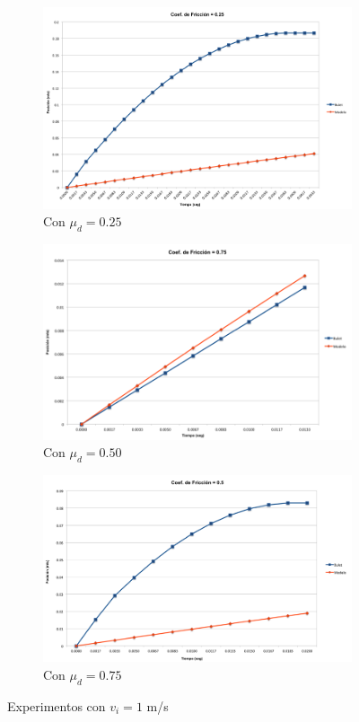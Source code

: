 \documentclass{article}
\begin{document}
\begin{itemize}
\begin{figure}[!ht] 
  \begin{subfigure}[b]{0.5\linewidth}
    \centering
    \includegraphics[width=0.75\linewidth]{image004.png} 
    \caption{Con $\mu_d=0.25$} 
    \label{fig3:a} 
    \vspace{4ex}
  \end{subfigure}%
  \begin{subfigure}[b]{0.5\linewidth}
    \centering
    \includegraphics[width=0.75\linewidth]{image005.png} 
    \caption{Con $\mu_d=0.50$} 
    \label{fig3:b} 
    \vspace{4ex}
  \end{subfigure} 
  \begin{subfigure}[b]{\linewidth}
    \centering
    \includegraphics[width=0.4\linewidth]{image006.png} 
    \caption{Con $\mu_d=0.75$} 
    \label{fig3:c} 
  \end{subfigure}%
  \caption{Experimentos con $v_i = 1$ m/s}
  \label{fig3} 
\end{figure}



\end{itemize}
\end{document}
